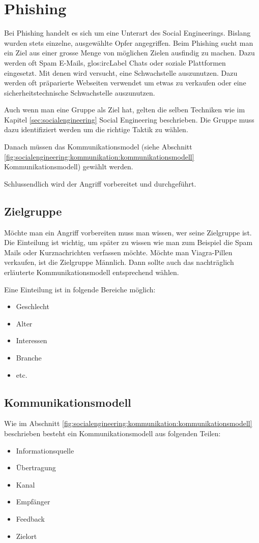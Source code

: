 \chapter{Phishing}
Bei Phishing handelt es sich um eine Unterart des Social Engineerings. Bislang wurden stets einzelne, ausgewählte Opfer angegriffen.
Beim Phishing sucht man ein Ziel aus einer grosse Menge von möglichen Zielen ausfindig zu machen. Dazu werden oft Spam E-Mails, \Gls{glos:ircLabel} Chats oder soziale Plattformen eingesetzt. Mit denen wird versucht, eine Schwachstelle auszunutzen. Dazu werden oft präparierte Webseiten verwendet um etwas zu verkaufen oder eine sicherheitstechnische Schwachstelle auszunutzen.

Auch wenn man eine Gruppe als Ziel hat, gelten die selben Techniken wie im Kapitel \ref{sec:socialengineering} Social Engineering beschrieben.
Die Gruppe muss dazu identifiziert werden um die richtige Taktik zu wählen.

Danach müssen das Kommunikationsmodel (siehe Abschnitt \ref{fig:socialengineering:kommunikation:kommunikationsmodell} Kommunikationsmodell) gewählt werden.

Schlussendlich wird der Angriff vorbereitet und durchgeführt.

\section{Zielgruppe}
Möchte man ein Angriff vorbereiten muss man wissen, wer seine Zielgruppe ist. Die Einteilung ist wichtig, um später zu wissen wie man zum Beispiel die Spam Mails oder Kurznachrichten verfassen möchte. Möchte man Viagra-Pillen verkaufen, ist die Zielgruppe Männlich. Dann sollte auch das nachträglich erläuterte Kommunikationsmodell entsprechend wählen.

Eine Einteilung ist in folgende Bereiche möglich:
\begin{itemize}
\item Geschlecht
\item Alter
\item Interessen
\item Branche
\item etc.
\end{itemize}

\section{Kommunikationsmodell}
Wie im Abschnitt \ref{fig:socialengineering:kommunikation:kommunikationsmodell} beschrieben besteht ein Kommunikationsmodell aus folgenden Teilen:
\begin{itemize}
\item Informationsquelle
\item Übertragung
\item Kanal
\item Empfänger
\item Feedback
\item Zielort
\end{itemize}

